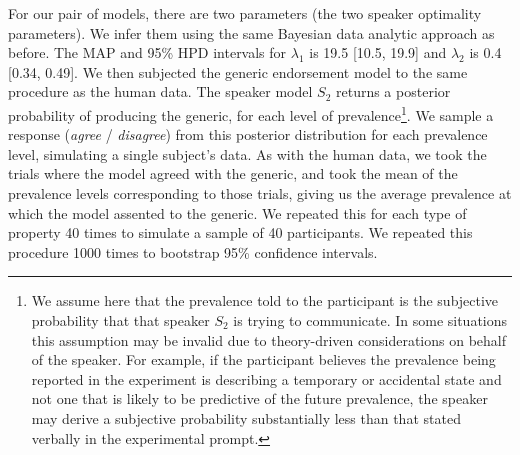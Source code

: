 \documentclass[12pt,letterpaper]{article}
\begin{document}
For our pair of models, there are two parameters (the two speaker optimality parameters).
We infer them using the same Bayesian data analytic approach as before. 
The MAP and 95\% HPD intervals for $\lambda_1$ is 19.5 [10.5, 19.9] and $\lambda_2$ is 0.4 [0.34, 0.49].
We then subjected the generic endorsement model to the same procedure as the human data. %
%
The speaker model $S_2$ returns a posterior probability of producing the generic, for each level of prevalence\footnote{We assume here that the prevalence told to the participant is the subjective probability that that speaker $S_2$ is trying to communicate. In some situations this assumption may be invalid due to theory-driven considerations on behalf of the speaker. For example, if the participant believes the prevalence being reported in the experiment is describing a temporary or accidental state and not one that is likely to be predictive of the future prevalence, the speaker may derive a subjective probability substantially less than that stated verbally in the experimental prompt.}. 
We sample a response (\emph{agree} / \emph{disagree}) from this posterior distribution for each prevalence level, simulating a single subject's data.
As with the human data, we took the trials where the model agreed with the generic, and took the mean of the prevalence levels corresponding to those trials, giving us the average prevalence at which the model assented to the generic.
We repeated this for each type of property 40 times to simulate a sample of 40 participants. 
We repeated this procedure 1000 times to bootstrap 95\% confidence intervals.
\end{document}
